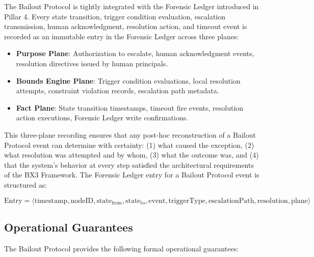 The Bailout Protocol is tightly integrated with the Forensic Ledger introduced in Pillar 4. Every state transition, trigger condition evaluation, escalation transmission, human acknowledgment, resolution action, and timeout event is recorded as an immutable entry in the Forensic Ledger across three planes:

\begin{itemize}
    \item \textbf{Purpose Plane}: Authorization to escalate, human acknowledgment events, resolution directives issued by human principals.
    \item \textbf{Bounds Engine Plane}: Trigger condition evaluations, local resolution attempts, constraint violation records, escalation path metadata.
    \item \textbf{Fact Plane}: State transition timestamps, timeout fire events, resolution action executions, Forensic Ledger write confirmations.
\end{itemize}

This three-plane recording ensures that any post-hoc reconstruction of a Bailout Protocol event can determine with certainty: (1) what caused the exception, (2) what resolution was attempted and by whom, (3) what the outcome was, and (4) that the system's behavior at every step satisfied the architectural requirements of the BX3 Framework. The Forensic Ledger entry for a Bailout Protocol event is structured as:

\[
\text{Entry} = \langle \text{timestamp}, \text{nodeID}, \text{state}_{\text{from}}, \text{state}_{\text{to}}, \text{event}, \text{triggerType}, \text{escalationPath}, \text{resolution}, \text{plane} \rangle
\]

\subsection{Operational Guarantees}

The Bailout Protocol provides the following formal operational guarantees:

